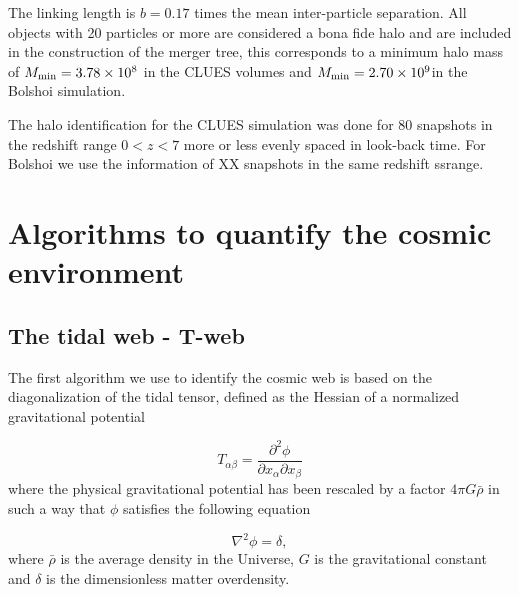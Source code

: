 \documentclass[usenatbib]{latex/mn2e}
\begin{document}
The linking length is $b=0.17$ times the mean inter-particle separation. 
All objects with 20 particles or more are considered a bona fide halo and 
are included in the construction of the merger tree, this corresponds to a 
minimum halo mass of $M_{\rm min}=3.78\times 10^{8}$ \hMsun in the CLUES 
volumes and $M_{\rm min}=2.70\times 10^{9}$\hMsun in the Bolshoi 
simulation.



The halo identification for the CLUES simulation was done for 80 snapshots
in the redshift range $0<z<7$ more or less evenly spaced in look-back time. 
For Bolshoi we use the information of XX snapshots in the same redshift 
ssrange.



\section{Algorithms to quantify the cosmic environment}
\label{sec:algorithms_cosmic_web}



\subsection{The tidal web - T-web}
\label{subsec:Tweb}



The first algorithm  we use to identify the cosmic web is based on the
diagonalization of the tidal tensor, defined as the Hessian of a 
normalized gravitational potential  


\begin{equation}
T_{\alpha\beta} = \frac{\partial^2\phi}{\partial x_{\alpha}\partial x_{\beta}}
\end{equation}
where the physical gravitational potential has been rescaled by a factor 
$4\pi G\bar{\rho}$ in such a way that $\phi$ satisfies the following 
equation



\begin{equation}
\nabla^2\phi = \delta,
\end{equation}
where $\bar{\rho}$ is the average density in the Universe, $G$ is the 
gravitational constant and $\delta$ is the dimensionless matter 
overdensity.
\end{document}
